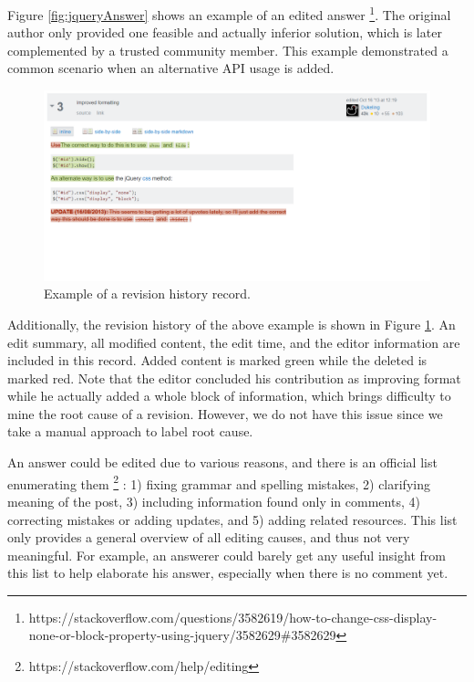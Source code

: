 \documentclass[10pt,conference]{IEEEtran}
\begin{document}
Figure \ref{fig:jqueryAnswer} shows an example of an edited answer \footnote{https://stackoverflow.com/questions/3582619/how-to-change-css-display-none-or-block-property-using-jquery/3582629\#3582629}. The original author only provided one feasible and actually inferior solution, which is later complemented by a trusted community member. This example demonstrated a common scenario when an alternative API usage is added.

\begin{figure}
  \includegraphics[width=\linewidth]{figure2.png}
  \caption{Example of a revision history record.}
  \label{fig:jqueryAnswerRevision}
\end{figure}

Additionally, the revision history of the above example is shown in Figure \ref{fig:jqueryAnswerRevision}. An edit summary, all modified content, the edit time, and the editor information are included in this record. Added content is marked green while the deleted is marked red. Note that the editor concluded his contribution as improving format while he actually added a whole block of information, which brings difficulty to mine the root cause of a revision. However, we do not have this issue since we take a manual approach to label root cause.

An answer could be edited due to various reasons, and there is an official list enumerating them \footnote{https://stackoverflow.com/help/editing} : 1) fixing grammar and spelling mistakes, 2) clarifying meaning of the post, 3) including information found only in comments, 4) correcting mistakes or adding updates, and 5) adding related resources. This list only provides a general overview of all editing causes, and thus not very meaningful. For example, an answerer could barely get any useful insight from this list to help elaborate his answer, especially when there is no comment yet.
\end{document}
